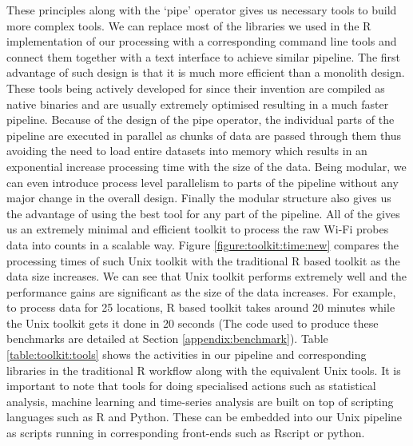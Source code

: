 These principles along with the `pipe' operator gives us necessary tools to build more complex tools.
We can replace most of the libraries we used in the R implementation of our processing with a corresponding command line tools and connect them together with a text interface to achieve similar pipeline.
The first advantage of such design is that it is much more efficient than a monolith design.
These tools being actively developed for since their invention are compiled as native binaries and are usually extremely optimised resulting in a much faster pipeline.
Because of the design of the pipe operator, the individual parts of the pipeline are executed in parallel as chunks of data are passed through them thus avoiding the need to load entire datasets into memory which results in an exponential increase processing time with the size of the data.
Being modular, we can even introduce process level parallelism to parts of the pipeline without any major change in the overall design.
Finally the modular structure also gives us the advantage of using the best tool for any part of the pipeline.
All of the gives us an extremely minimal and efficient toolkit to process the raw Wi-Fi probes data into counts in a scalable way.
Figure \ref{figure:toolkit:time:new} compares the processing times of such Unix toolkit with the traditional R based toolkit as the data size increases.
We can see that Unix toolkit performs extremely well and the performance gains are significant as the size of the data increases.
For example, to process data for 25 locations, R based toolkit takes around 20 minutes while the Unix toolkit gets it done in 20 seconds 
(The code used to produce these benchmarks are detailed at Section \ref{appendix:benchmark}).
Table \ref{table:toolkit:tools} shows the activities in our pipeline and corresponding libraries in the traditional R workflow along with the equivalent Unix tools.
It is important to note that tools for doing specialised actions such as statistical analysis, machine learning and time-series analysis are built on top of scripting languages such as R and Python.
These can be embedded into our Unix pipeline as scripts running in corresponding front-ends such as Rscript or python.

